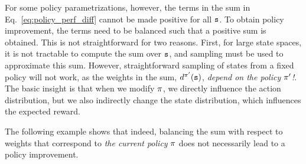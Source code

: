 For some policy parametrizations, however, the terms in the sum in Eq.~\ref{eq:policy_perf_diff} cannot be made positive for all ${\tt s}$. To obtain policy improvement, the terms need to be balanced such that a positive sum is obtained. This is not straightforward for two reasons. First, for large state spaces, it is not tractable to compute the sum over ${\tt s}$, and sampling must be used to approximate this sum. However, straightforward sampling of states from a fixed policy will not work, as the weights in the sum, $d^{\pi'}({\tt s})$, \textit{depend on the policy $\pi'$!}.
The basic insight is that when we modify $\pi$, we directly influence the action distribution, but we also indirectly change the state distribution, which influences the expected reward.

The following example shows that indeed, balancing the sum with respect to weights that correspond to \textit{the current policy} $\pi$ does not necessarily lead to a policy improvement. 
